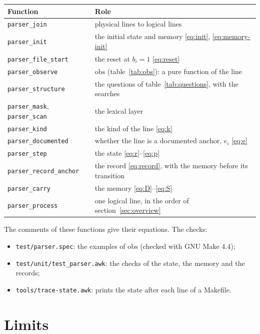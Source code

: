 \documentclass[11pt]{article}
\newcommand{\code}[1]{\mbox{\texttt{#1}}}
\newcommand{\obs}{\mathrm{obs}}
\begin{document}
\begin{center}
\begin{tabular}{@{}lP{0.62\textwidth}@{}}
  \toprule
  Function & Role \\
  \midrule
  \code{parser\_join} & physical lines to logical lines \\
  \code{parser\_init} & the initial state and memory \eqref{eq:init},
                        \eqref{eq:memory-init} \\
  \code{parser\_file\_start} & the reset at $b_i = 1$ \eqref{eq:reset} \\
  \code{parser\_observe} & $\obs$ (table~\ref{tab:obs}): a pure function of the line \\
  \code{parser\_structure} & the questions of table~\ref{tab:questions}, with the searches \\
  \code{parser\_mask}, \code{parser\_scan} & the lexical layer \\
  \code{parser\_kind} & the kind of the line \eqref{eq:k} \\
  \code{parser\_documented} & whether the line is a documented anchor, $e_i$ \eqref{eq:e} \\
  \code{parser\_step} & the state \eqref{eq:r}--\eqref{eq:p} \\
  \code{parser\_record\_anchor} & the record \eqref{eq:record}, with the memory before
                                 its transition \\
  \code{parser\_carry} & the memory \eqref{eq:D}--\eqref{eq:S} \\
  \code{parser\_process} & one logical line, in the order of section~\ref{sec:overview} \\
  \bottomrule
\end{tabular}
\end{center}

\noindent The comments of these functions give their equations. The checks:
\begin{itemize}
  \item \code{test/parser.spec}: the examples of $\obs$ (checked with GNU Make 4.4);
  \item \code{test/unit/test\_parser.awk}: the checks of the state, the memory and the
        records;
  \item \code{tools/trace-state.awk}: prints the state after each line of a Makefile.
\end{itemize}

\section{Limits}
\end{document}
